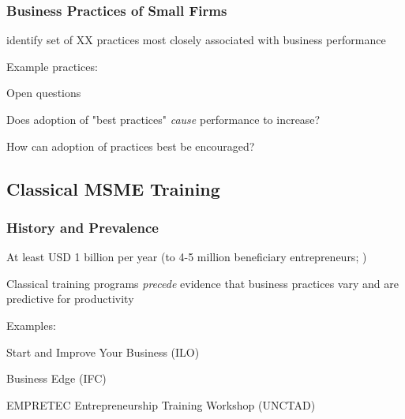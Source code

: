 \documentclass[hideothersubsections, usenames,dvipsnames,11pt]{beamer}
\newenvironment{itemize_2pt}{\itemize\addtolength{\itemsep}{2pt}}{\enditemize}
\begin{document}
\begin{frame}
\frametitle{Business Practices of Small Firms}
	\citet{McKenzie2017} identify set of XX practices most closely associated with business performance
	\begin{itemize_2pt}
		\item Example practices:
		\begin{itemize_2pt}
			\item 
			\item 
			\item 
			\item 
			\item 
		\end{itemize_2pt}
	\end{itemize_2pt}
	
\vspace{0.1in}	
	
	Open questions
	\begin{itemize_2pt}
		\item Does adoption of "best practices" \emph{cause} performance to increase?
		\item How can adoption of practices best be encouraged?
	\end{itemize_2pt}
\end{frame}


\subsection{Classical MSME Training}


\begin{frame}
\frametitle{History and Prevalence}
	\begin{itemize_2pt}
		\item At least \textcolor{bdf}{USD 1 billion per year} (to 4-5 million beneficiary entrepreneurs; \citet{McKenzie2020})
		\item Classical training programs \emph{precede} evidence that business practices vary and are predictive for productivity
		\item Examples:
		\begin{itemize_2pt}
			\item Start and Improve Your Business (ILO)
			\item Business Edge (IFC)
			\item EMPRETEC Entrepreneurship Training Workshop (UNCTAD)
		\end{itemize_2pt} 
	\end{itemize_2pt}
\end{frame}
\end{document}

